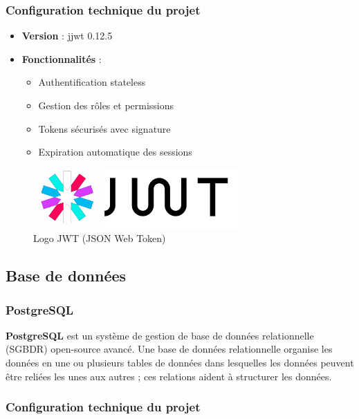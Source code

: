 \documentclass[12pt,a4paper]{report}
\begin{document}
\subsubsection{Configuration technique du projet}

\begin{itemize}
\item \textbf{Version} : jjwt 0.12.5
\item \textbf{Fonctionnalités} :
  \begin{itemize}
  \item Authentification stateless
  \item Gestion des rôles et permissions
  \item Tokens sécurisés avec signature
  \item Expiration automatique des sessions
  \end{itemize}
\end{itemize}

\begin{figure}[H]
\centering
\includegraphics[width=0.7\textwidth]{latex_media/media/image25.png}
\caption{Logo JWT (JSON Web Token)}
\label{fig:logo-jwt}
\end{figure}

\subsection{Base de données}

\subsubsection{PostgreSQL}

\textbf{PostgreSQL} est un système de gestion de base de données relationnelle (SGBDR) open-source avancé. Une base de données relationnelle organise les données en une ou plusieurs tables de données dans lesquelles les données peuvent être reliées les unes aux autres ; ces relations aident à structurer les données.

\subsubsection{Configuration technique du projet}
\end{document}
